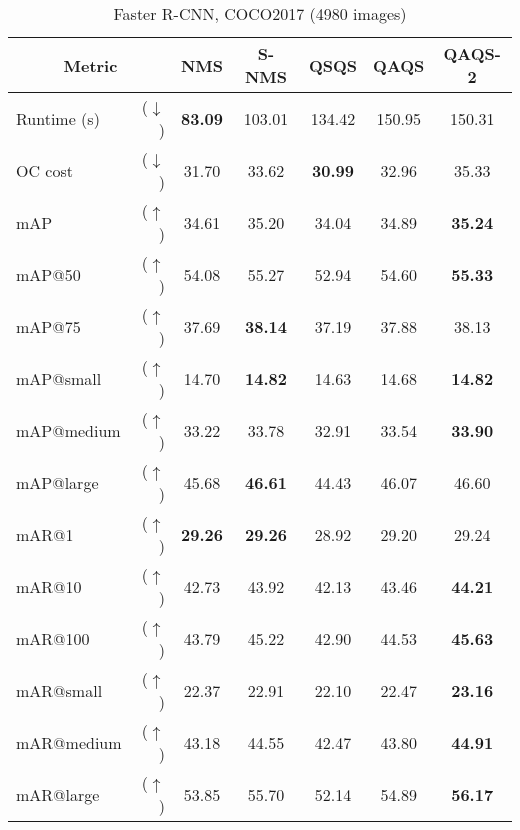 \setlength\tabcolsep{0.75mm} 
\begin{table}
    \centering
    \caption{Faster R-CNN, COCO2017 (4980 images)}
    \begin{tabular}{l r ccccc}
    \toprule
    \multicolumn{2}{c}{Metric} & NMS & S-NMS & QSQS & QAQS & QAQS-2 \\
    \midrule 
    Runtime (s)&($\downarrow$)& \textbf{83.09} & 103.01 & 134.42 & 150.95 & 150.31 \\ 
    \midrule        
    OC cost    &($\downarrow$)& 31.70 &  33.62 &  \textbf{30.99} &  32.96 &  35.33 \\
    \midrule        
    mAP        & ($\uparrow$) & 34.61 &  35.20 &  34.04 &  34.89 &  \textbf{35.24} \\
    mAP@50     & ($\uparrow$) & 54.08 &  55.27 &  52.94 &  54.60 &  \textbf{55.33} \\
    mAP@75     & ($\uparrow$) & 37.69 &  \textbf{38.14} &  37.19 &  37.88 & 38.13 \\
    mAP@small  & ($\uparrow$) & 14.70 &  \textbf{14.82} &  14.63 &  14.68 &  \textbf{14.82} \\
    mAP@medium & ($\uparrow$) & 33.22 &  33.78 &  32.91 &  33.54 &  \textbf{33.90} \\
    mAP@large  & ($\uparrow$) & 45.68 &  \textbf{46.61} &  44.43 &  46.07 &  46.60 \\
    \midrule 
    mAR@1      & ($\uparrow$) & \textbf{29.26} &  \textbf{29.26} &  28.92 &  29.20 &  29.24 \\
    mAR@10     & ($\uparrow$) & 42.73 &  43.92 &  42.13 &  43.46 &  \textbf{44.21} \\
    mAR@100    & ($\uparrow$) & 43.79 &  45.22 &  42.90 &  44.53 &  \textbf{45.63} \\
    mAR@small  & ($\uparrow$) & 22.37 &  22.91 &  22.10 &  22.47 &  \textbf{23.16} \\
    mAR@medium & ($\uparrow$) & 43.18 &  44.55 &  42.47 &  43.80 &  \textbf{44.91} \\
    mAR@large  & ($\uparrow$) & 53.85 &  55.70 &  52.14 &  54.89 &  \textbf{56.17} \\
    \bottomrule
    \end{tabular}
\end{table}

